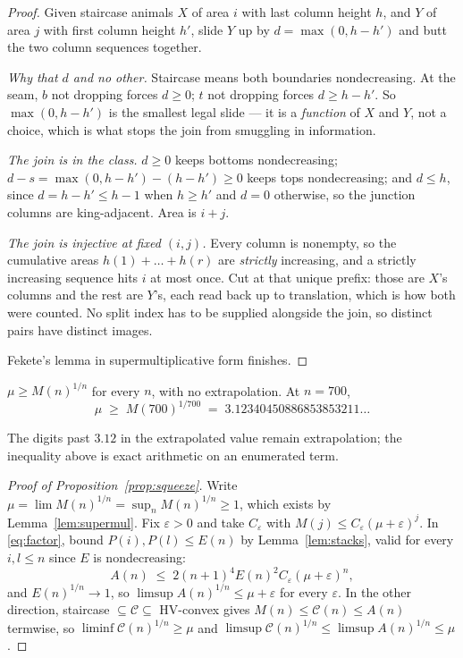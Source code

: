 \documentclass[11pt]{article}
\begin{document}
\begin{proof}
Given staircase animals $X$ of area $i$ with last column height $h$, and $Y$ of
area $j$ with first column height $h'$, slide $Y$ up by $d = \max(0, h-h')$ and
butt the two column sequences together.

\emph{Why that $d$ and no other.} Staircase means both boundaries
nondecreasing. At the seam, $b$ not dropping forces $d \ge 0$; $t$ not dropping
forces $d \ge h - h'$. So $\max(0, h-h')$ is the smallest legal slide --- it is a
\emph{function} of $X$ and $Y$, not a choice, which is what stops the join from
smuggling in information.

\emph{The join is in the class.} $d \ge 0$ keeps bottoms nondecreasing;
$d - s = \max(0,h-h') - (h-h') \ge 0$ keeps tops nondecreasing; and $d \le h$,
since $d = h-h' \le h-1$ when $h \ge h'$ and $d = 0$ otherwise, so the junction
columns are king-adjacent. Area is $i+j$.

\emph{The join is injective at fixed $(i,j)$.} Every column is nonempty, so the
cumulative areas $h(1)+\dots+h(r)$ are \emph{strictly} increasing, and a
strictly increasing sequence hits $i$ at most once. Cut at that unique prefix:
those are $X$'s columns and the rest are $Y$'s, each read back up to
translation, which is how both were counted. No split index has to be supplied
alongside the join, so distinct pairs have distinct images.

Fekete's lemma in supermultiplicative form finishes.
\end{proof}

\begin{corollary}
\label{cor:floor}
$\mu \ge M(n)^{1/n}$ for every $n$, with no extrapolation. At $n = 700$,
\[
  \mu \;\ge\; M(700)^{1/700} \;=\; 3.12340450886853853211\dots
\]
\end{corollary}

The digits past $3.12$ in the extrapolated value remain extrapolation; the
inequality above is exact arithmetic on an enumerated term.

\begin{proof}[Proof of Proposition~\ref{prop:squeeze}]
Write $\mu = \lim M(n)^{1/n} = \sup_n M(n)^{1/n} \ge 1$, which exists by
Lemma~\ref{lem:supermul}. Fix $\varepsilon > 0$ and take $C_\varepsilon$ with
$M(j) \le C_\varepsilon(\mu+\varepsilon)^j$. In \eqref{eq:factor}, bound
$P(i), P(l) \le E(n)$ by Lemma~\ref{lem:stacks}, valid for every $i, l \le n$
since $E$ is nondecreasing:
\[
  A(n) \;\le\; 2(n{+}1)^4 E(n)^2 C_\varepsilon (\mu+\varepsilon)^n ,
\]
and $E(n)^{1/n} \to 1$, so $\limsup A(n)^{1/n} \le \mu + \varepsilon$ for every
$\varepsilon$. In the other direction, staircase $\subseteq \mathcal C
\subseteq$ HV-convex gives $M(n) \le \mathcal C(n) \le A(n)$ termwise, so
$\liminf \mathcal C(n)^{1/n} \ge \mu$ and
$\limsup \mathcal C(n)^{1/n} \le \limsup A(n)^{1/n} \le \mu$.
\end{proof}
\end{document}
